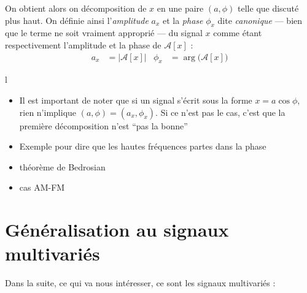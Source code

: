\begin{definition}\label{def:ampli&phase_cano}
	On obtient alors on décomposition de $x$ en une paire $(a,\phi)$ telle que discuté plus haut. On définie ainsi l'\emph{amplitude} $a_x$ et la \emph{phase} $\phi_x$ dite \emph{canonique} --- bien que le terme ne soit vraiment approprié --- du signal $x$ comme étant respectivement l'amplitude et la phase de $\mathcal{A}[x]$ :
	\begin{align}\label{eq:ampli&phase_cano}
		a_x &= \big|\mathcal{A}[x]\big|   &   \phi_x &= \arg\big(\mathcal{A}[x]\big)
	\end{align}
\end{definition}


\begin{enonce}[TO DO]{\color{white}l}
	
	\begin{itemize}
		
		\item Il est important de noter que si un signal s'écrit sous la forme  $x=a\cos\phi$, rien n'implique $(a,\phi)=(a_x,\phi_x)$. Si ce n'est pas le cas, c'est que la première décomposition n'est ``pas la bonne''
		
		\item Exemple pour dire que les hautes fréquences partes dans la phase
		
		\item théorème de Bedrosian \cite{venouziou_characterizing_2008}
		
		\item cas AM-FM

	\end{itemize}
\end{enonce}


\section{Généralisation au signaux multivariés}\label{sec:sign_multivar}

Dans la suite, ce qui va nous intéresser, ce sont les signaux multivariés :
\\

